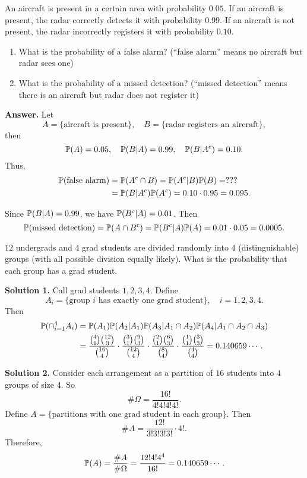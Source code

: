 \begin{example}
  An aircraft is present in a certain area with probability $0.05$. If an
  aircraft is present, the radar correctly detects it with probability $0.99$.
  If an aircraft is not present, the radar incorrectly registers it with
  probability $0.10$.
  \begin{enumerate}[(1)]
  \item What is the probability of a false alarm? (``false alarm'' means no
    aircraft but radar sees one)
  \item What is the probability of a missed detection? (``missed detection''
    means there is an aircraft but radar does not register it)
  \end{enumerate}
\end{example}
\textbf{Answer.} Let
\[
  A = \{\text{aircraft is present}\},\quad B = \{\text{radar registers an aircraft}\},
\]
then
\[
  \mathbb{P}(A) = 0.05,\quad \mathbb{P}(B|A) = 0.99, \quad \mathbb{P}(B|A^c) = 0.10.
\]
Thus,
\begin{align*}
  \mathbb{P}(\text{false alarm}) & = \mathbb{P}(A^c\cap B) = \mathbb{P}(A^c|B) \mathbb{P}(B) = ???\\
  & = \mathbb{P}(B|A^c)\mathbb{P}(A^c) = 0.10\cdot 0.95 = 0.095.
\end{align*}

Since $\mathbb{P}(B|A) = 0.99$, we have $\mathbb{P}(B^c|A) = 0.01$. Then
\[
  \mathbb{P}(\text{missed detection}) = \mathbb{P}(A\cap B^c) = \mathbb{P}(B^c|A) \mathbb{P}(A) = 0.01\cdot
  0.05 = 0.0005.
\]
\begin{example}
  $12$ undergrads and $4$ grad students are divided randomly into $4$
  (distinguishable) groups
  (with all possible division equally likely). What is the probability that each
  group has a grad student.
\end{example}

\textbf{Solution 1.} Call grad students $1,2,3,4$. Define
\[
  A_i = \{\text{group $i$ has exactly one grad student}\},\quad i = 1,2,3,4.
\]
Then
\begin{align*}
  \mathbb{P}(\cap_{i=1}^4 A_i) & = \mathbb{P}(A_1)\mathbb{P}(A_2|A_1)\mathbb{P}(A_3|A_1\cap A_2)\mathbb{P}(A_4|A_1\cap A_2\cap A_3)\\
                        & = \frac{\binom{4}{1}\binom{12}{3}}{\binom{16}{4}}\cdot \frac{\binom{3}{1}\binom{9}{3}}{\binom{12}{4}}\cdot \frac{\binom{2}{1}\binom{6}{3}}{\binom{8}{4}}\cdot \frac{\binom{1}{1}\binom{3}{3}}{\binom{4}{4}} = 0.140659\cdots. 
\end{align*}

\textbf{Solution 2.} Consider each arrangement as a partition of $16$ students
into $4$ groups of size $4$. So
\[
  \# \Omega = \frac{16!}{4!4!4!4!}.
\]
Define $A = \{\text{partitions with one grad student in each group}\}$. Then
\[
  \# A = \frac{12!}{3!3!3!3!}\cdot 4!.
\]
Therefore,
\[
  \mathbb{P}(A) = \frac{\# A}{\# \Omega} = \frac{12!4!4^4}{16!} = 0.140659\cdots.
\]

